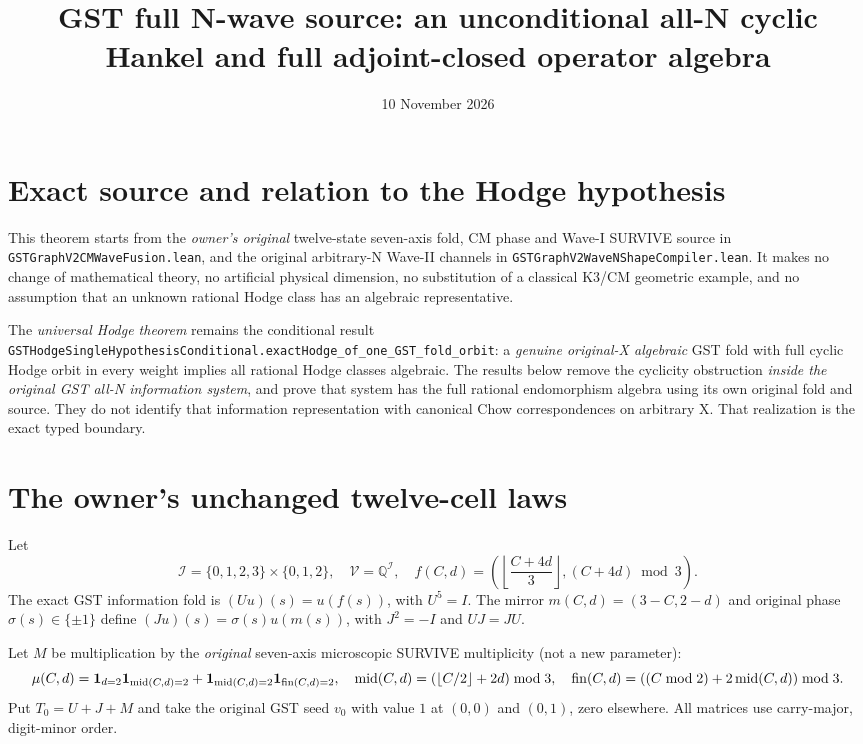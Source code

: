 \documentclass[11pt]{article}
\title{GST full N-wave source: an unconditional all-N cyclic Hankel and full adjoint-closed operator algebra}
\date{10 November 2026}
\newcommand{\Q}{\mathbb Q}
\begin{document}
\maketitle

\section{Exact source and relation to the Hodge hypothesis}
This theorem starts from the \emph{owner's original} twelve-state seven-axis fold, CM phase and Wave-I SURVIVE source in \texttt{GSTGraphV2CMWaveFusion.lean}, and the original arbitrary-N Wave-II channels in \texttt{GSTGraphV2WaveNShapeCompiler.lean}. It makes no change of mathematical theory, no artificial physical dimension, no substitution of a classical K3/CM geometric example, and no assumption that an unknown rational Hodge class has an algebraic representative.

The \emph{universal Hodge theorem} remains the conditional result \texttt{GSTHodgeSingleHypothesisConditional.exactHodge_of_one_GST_fold_orbit}: a \emph{genuine original-X algebraic} GST fold with full cyclic Hodge orbit in every weight implies all rational Hodge classes algebraic. The results below remove the cyclicity obstruction \emph{inside the original GST all-N information system}, and prove that system has the full rational endomorphism algebra using its own original fold and source. They do not identify that information representation with canonical Chow correspondences on arbitrary X. That realization is the exact typed boundary.

\section{The owner's unchanged twelve-cell laws}
Let
\[
 \mathscr I=\{0,1,2,3\}\times\{0,1,2\},\quad
 \mathscr V=\Q^{\mathscr I},\quad
 f(C,d)=\left(\left\lfloor\frac{C+4d}{3}\right\rfloor,(C+4d)\bmod3\right).
\]
The exact GST information fold is $(Uu)(s)=u(f(s))$, with $U^5=I$. The mirror $m(C,d)=(3-C,2-d)$ and original phase $\sigma(s)\in\{\pm1\}$ define $(Ju)(s)=\sigma(s)u(m(s))$, with $J^2=-I$ and $UJ=JU$.

Let $M$ be multiplication by the \emph{original} seven-axis microscopic SURVIVE multiplicity (not a new parameter):
\[
 \mu(C,d)=
 {\bf1}_{d=2}{\bf1}_{\mathrm{mid}(C,d)=2}
 +{\bf1}_{\mathrm{mid}(C,d)=2}
  {\bf1}_{\mathrm{fin}(C,d)=2},
\quad
\mathrm{mid}(C,d)=\left(\lfloor C/2\rfloor+2d\right)\bmod3,
\quad
\mathrm{fin}(C,d)=\left((C\bmod2)+2\,\mathrm{mid}(C,d)\right)\bmod3.
\]
Put $T_0=U+J+M$ and take the original GST seed $v_0$ with value $1$ at $(0,0)$ and $(0,1)$, zero elsewhere. All matrices use carry-major, digit-minor order.
\end{document}
